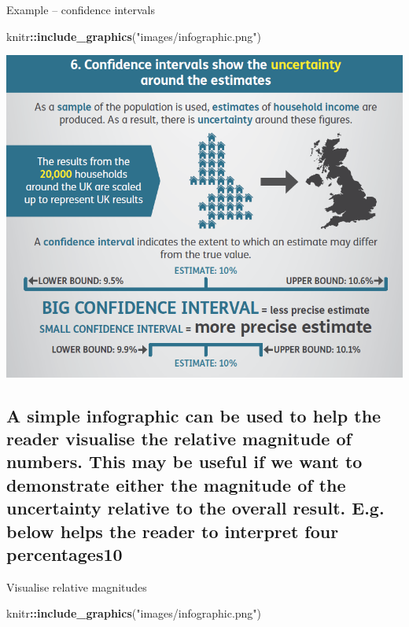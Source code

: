 \documentclass[]{book}
\newenvironment{Shaded}{\begin{snugshade}}{\end{snugshade}}
\newcommand{\KeywordTok}[1]{\textcolor[rgb]{0.13,0.29,0.53}{\textbf{#1}}}
\newcommand{\StringTok}[1]{\textcolor[rgb]{0.31,0.60,0.02}{#1}}
\newcommand{\OperatorTok}[1]{\textcolor[rgb]{0.81,0.36,0.00}{\textbf{#1}}}
\newcommand{\NormalTok}[1]{#1}
\begin{document}
 Example -- confidence intervals

\begin{Shaded}
\begin{Highlighting}[]
\NormalTok{knitr}\OperatorTok{::}\KeywordTok{include_graphics}\NormalTok{(}\StringTok{"images/infographic.png"}\NormalTok{)}
\end{Highlighting}
\end{Shaded}

\begin{center}\includegraphics{images/infographic} \end{center}

\subsection{A simple infographic can be used to help the reader
visualise the relative magnitude of numbers. This may be useful if we
want to demonstrate either the magnitude of the uncertainty relative to
the overall result. E.g. below helps the reader to interpret four
percentages10}\label{a-simple-infographic-can-be-used-to-help-the-reader-visualise-the-relative-magnitude-of-numbers.-this-may-be-useful-if-we-want-to-demonstrate-either-the-magnitude-of-the-uncertainty-relative-to-the-overall-result.-e.g.-below-helps-the-reader-to-interpret-four-percentages10}

 Visualise relative magnitudes

\begin{Shaded}
\begin{Highlighting}[]
\NormalTok{knitr}\OperatorTok{::}\KeywordTok{include_graphics}\NormalTok{(}\StringTok{"images/infographic.png"}\NormalTok{)}
\end{Highlighting}
\end{Shaded}
\end{document}
